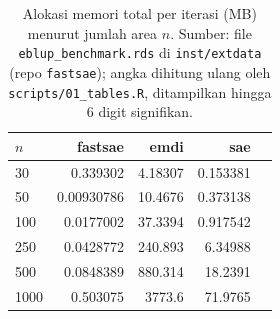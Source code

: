 \begin{table}[htbp]
\centering
\caption{Alokasi memori total per iterasi (MB) menurut jumlah area $n$. Sumber: file \texttt{eblup\_benchmark.rds} di \texttt{inst/extdata} (repo \texttt{fastsae}); angka dihitung ulang oleh \texttt{scripts/01\_tables.R}, ditampilkan hingga 6 digit signifikan.}
\label{tab:mem-fh}
\small
\begin{tabular}{lrrrr}
\toprule
$n$ & fastsae & emdi & sae \\
\midrule
30 & 0.339302 & 4.18307 & 0.153381 \\
50 & 0.00930786 & 10.4676 & 0.373138 \\
100 & 0.0177002 & 37.3394 & 0.917542 \\
250 & 0.0428772 & 240.893 & 6.34988 \\
500 & 0.0848389 & 880.314 & 18.2391 \\
1000 & 0.503075 &  3773.6 & 71.9765 \\
\bottomrule
\end{tabular}
\end{table}

